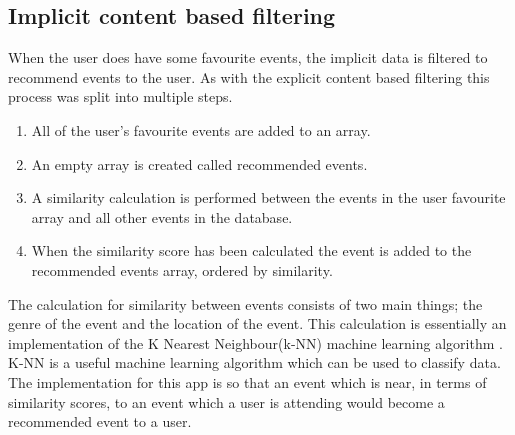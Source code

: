 \subsection{Implicit content based filtering}
When the user does have some favourite events, the implicit data is filtered to recommend events to the user. As with the explicit content based filtering this process was split into multiple steps.
\begin{enumerate} 
  \item All of the user's favourite events are added to an array.
  \item An empty array is created called recommended events.
  \item A similarity calculation is performed between the events in the user favourite array and all other events in the database.
  \item When the similarity score has been calculated the event is added to the recommended events array, ordered by similarity. 
\end{enumerate}
The calculation for similarity between events consists of two main things; the genre of the event and the location of the event. This calculation is essentially an implementation of the K Nearest Neighbour(k-NN) machine learning algorithm \cite{knn} \cite{knn2}. K-NN is a useful machine learning algorithm which can be used to classify data. The implementation for this app is so that an event which is near, in terms of similarity scores, to an event which a user is attending would become a recommended event to a user. 


